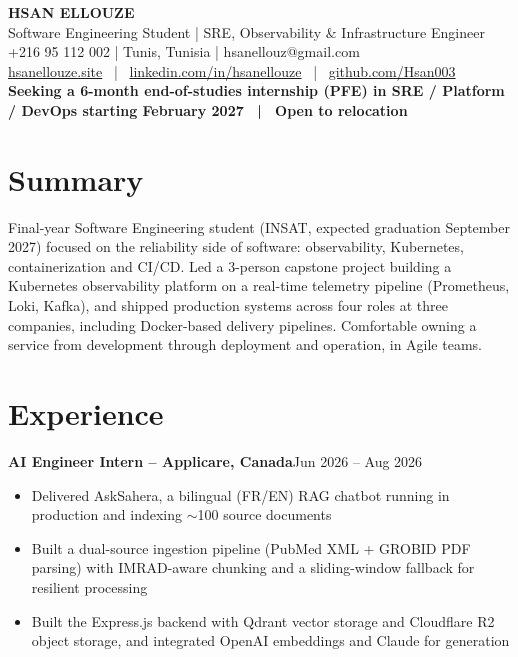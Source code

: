 \documentclass[10pt,a4paper]{article}
\newcommand{\entry}[2]{\vspace{1pt}\noindent\textbf{#1}\hfill{\color{muted}#2}\par}
\begin{document}
\begin{center}
  {\LARGE\bfseries HSAN ELLOUZE}\\[2pt]
  {\color{muted} Software Engineering Student | SRE, Observability \& Infrastructure Engineer}\\[2pt]
  {\footnotesize +216 95 112 002 | Tunis, Tunisia | hsanellouz@gmail.com}\\[1pt]
  {\footnotesize \href{https://hsanellouze.site}{hsanellouze.site} \ | \ \href{https://linkedin.com/in/hsanellouze}{linkedin.com/in/hsanellouze} \ | \ \href{https://github.com/Hsan003}{github.com/Hsan003}}\\[3pt]
  {\footnotesize\bfseries Seeking a 6-month end-of-studies internship (PFE) in SRE / Platform / DevOps starting February 2027 \ | \ Open to relocation}
\end{center}

\section{Summary}
Final-year Software Engineering student (INSAT, expected graduation September 2027) focused on the reliability side of software: observability, Kubernetes, containerization and CI/CD. Led a 3-person capstone project building a Kubernetes observability platform on a real-time telemetry pipeline (Prometheus, Loki, Kafka), and shipped production systems across four roles at three companies, including Docker-based delivery pipelines. Comfortable owning a service from development through deployment and operation, in Agile teams.

\section{Experience}
\entry{AI Engineer Intern -- Applicare, Canada}{Jun 2026 -- Aug 2026}
\begin{itemize}
  \item Delivered AskSahera, a bilingual (FR/EN) RAG chatbot running in production and indexing $\sim$100 source documents
  \item Built a dual-source ingestion pipeline (PubMed XML + GROBID PDF parsing) with IMRAD-aware chunking and a sliding-window fallback for resilient processing
  \item Built the Express.js backend with Qdrant vector storage and Cloudflare R2 object storage, and integrated OpenAI embeddings and Claude for generation
\end{itemize}
\end{document}
